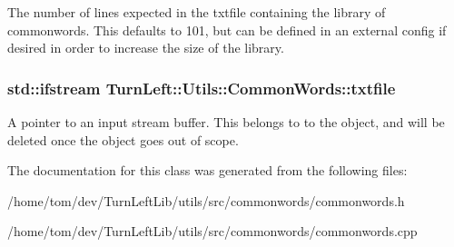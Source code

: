 \label{classTurnLeft_1_1Utils_1_1CommonWords_afc0cb129b7578c3ea5bf63cf3284e630}
The number of lines expected in the txtfile containing the library of commonwords. This defaults to 101, but can be defined in an external config if desired in order to increase the size of the library. \hypertarget{classTurnLeft_1_1Utils_1_1CommonWords_af284f9a4b03f822914fe9a7c6e4e267c}{
\subsubsection[{txtfile}]{\setlength{\rightskip}{0pt plus 5cm}std::ifstream {\bf TurnLeft::Utils::CommonWords::txtfile}}}
\label{classTurnLeft_1_1Utils_1_1CommonWords_af284f9a4b03f822914fe9a7c6e4e267c}
A pointer to an input stream buffer. This belongs to to the object, and will be deleted once the object goes out of scope. 

The documentation for this class was generated from the following files:\begin{DoxyCompactItemize}
\item 
/home/tom/dev/TurnLeftLib/utils/src/commonwords/commonwords.h\item 
/home/tom/dev/TurnLeftLib/utils/src/commonwords/commonwords.cpp\end{DoxyCompactItemize}
